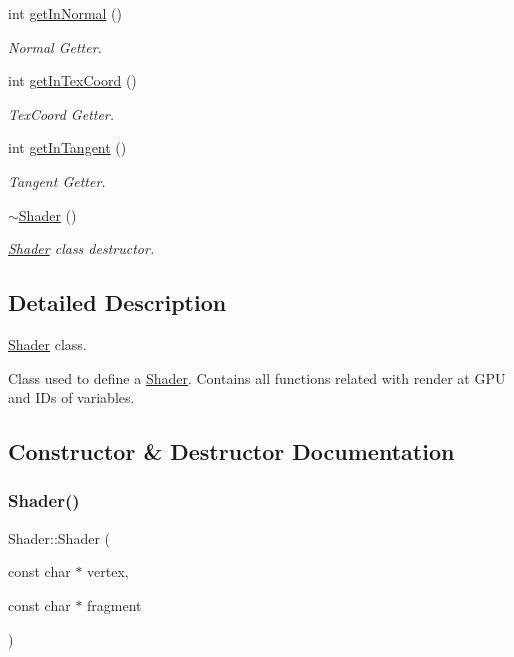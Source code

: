 \begin{DoxyCompactItemize}
int \hyperlink{class_shader_a9647f6a0356188f9f56787dbebde4731}{get\+In\+Normal} ()
\begin{DoxyCompactList}\small\item\em Normal Getter. \end{DoxyCompactList}\item 
int \hyperlink{class_shader_a386214ac36c08a8405ec458f75d17d12}{get\+In\+Tex\+Coord} ()
\begin{DoxyCompactList}\small\item\em Tex\+Coord Getter. \end{DoxyCompactList}\item 
int \hyperlink{class_shader_aad0dc2b502af0bcf6c5aa99e60fc296a}{get\+In\+Tangent} ()
\begin{DoxyCompactList}\small\item\em Tangent Getter. \end{DoxyCompactList}\item 
\hyperlink{class_shader_aff01df87e8a102f270b5b135a295e59d}{$\sim$\+Shader} ()
\begin{DoxyCompactList}\small\item\em \hyperlink{class_shader}{Shader} class destructor. \end{DoxyCompactList}\end{DoxyCompactItemize}


\subsection{Detailed Description}
\hyperlink{class_shader}{Shader} class. 

Class used to define a \hyperlink{class_shader}{Shader}. Contains all functions related with render at G\+PU and I\+Ds of variables. 

\subsection{Constructor \& Destructor Documentation}
\mbox{\label{class_shader_a7e02f1eaec796a7fc02c3191ce9fa5d4}} 
\subsubsection{\texorpdfstring{Shader()}{Shader()}}
{\footnotesize\ttfamily Shader\+::\+Shader (\begin{DoxyParamCaption}\item[{const char $\ast$}]{vertex,  }\item[{const char $\ast$}]{fragment }\end{DoxyParamCaption})}



